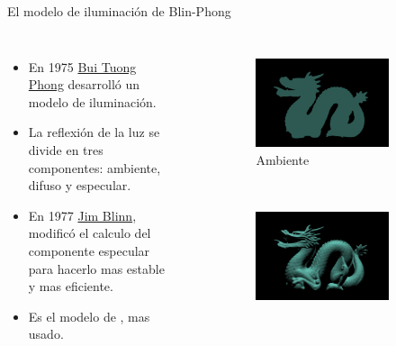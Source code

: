 \begin{frame}{El modelo de iluminación de Blin-Phong}
\begin{columns}
\begin{itemize}
 \item En 1975 \href{https://en.wikipedia.org/wiki/Phong_reflection_model}{Bui Tuong Phong} desarrolló un modelo de iluminación.
 \item La reflexión de la luz se divide en tres componentes: ambiente, difuso y especular.
 \item En 1977 \href{https://en.wikipedia.org/wiki/Blinn-Phong_reflection_model}{Jim Blinn}, modificó el calculo del componente especular para hacerlo mas estable y mas eficiente.
 \item Es el modelo de , mas usado.
\end{itemize}
\begin{figure}[htp]
 \centering
 \begin{subfigure}[b]{0.42\textwidth}
   \includegraphics[width=\textwidth]{img/ambiente}
   \caption{Ambiente}
 \end{subfigure}
~
 \begin{subfigure}[b]{0.42\textwidth}
   \includegraphics[width=\textwidth]{img/difuso}

\end{subfigure}
\end{figure}
\end{columns}
\end{frame}
